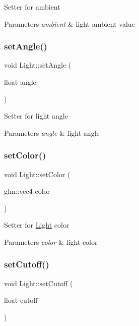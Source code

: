 Setter for ambient 
\begin{DoxyParams}{Parameters}
{\em ambient} & light ambient value \\
\hline
\end{DoxyParams}
\mbox{\label{classLight_a95eee24e173aa9e0432a9c1324f4faec}} 
\subsubsection{\texorpdfstring{set\+Angle()}{setAngle()}}
{\footnotesize\ttfamily void Light\+::set\+Angle (\begin{DoxyParamCaption}\item[{float}]{angle }\end{DoxyParamCaption})}

Setter for light angle 
\begin{DoxyParams}{Parameters}
{\em angle} & light angle \\
\hline
\end{DoxyParams}
\mbox{\label{classLight_aaf638193c905de52570362eccd920714}} 
\subsubsection{\texorpdfstring{set\+Color()}{setColor()}}
{\footnotesize\ttfamily void Light\+::set\+Color (\begin{DoxyParamCaption}\item[{glm\+::vec4}]{color }\end{DoxyParamCaption})}

Setter for \hyperlink{classLight}{Light} color 
\begin{DoxyParams}{Parameters}
{\em color} & light color \\
\hline
\end{DoxyParams}
\mbox{\label{classLight_adb7e95904a97034f319b60236e578ecc}} 
\subsubsection{\texorpdfstring{set\+Cutoff()}{setCutoff()}}
{\footnotesize\ttfamily void Light\+::set\+Cutoff (\begin{DoxyParamCaption}\item[{float}]{cutoff }\end{DoxyParamCaption})}

